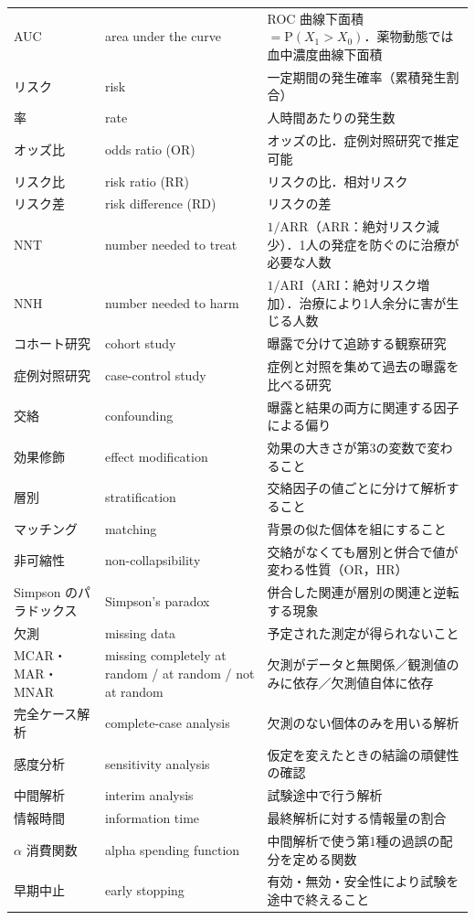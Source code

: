 \documentclass[a4paper,11pt,openany]{ltjsbook}
\newcommand{\Prob}{\mathrm{P}}
\begin{document}
\begin{center}
\begin{longtable}{@{}L{32mm}L{40mm}L{78mm}@{}}
AUC & area under the curve & ROC 曲線下面積 $=\Prob(X_1>X_0)$．薬物動態では血中濃度曲線下面積\\
リスク & risk & 一定期間の発生確率（累積発生割合）\\
率 & rate & 人時間あたりの発生数\\
オッズ比 & odds ratio (OR) & オッズの比．症例対照研究で推定可能\\
リスク比 & risk ratio (RR) & リスクの比．相対リスク\\
リスク差 & risk difference (RD) & リスクの差\\
NNT & number needed to treat & $1/\mathrm{ARR}$（ARR：絶対リスク減少）．1人の発症を防ぐのに治療が必要な人数\\
NNH & number needed to harm & $1/\mathrm{ARI}$（ARI：絶対リスク増加）．治療により1人余分に害が生じる人数\\
コホート研究 & cohort study & 曝露で分けて追跡する観察研究\\
症例対照研究 & case-control study & 症例と対照を集めて過去の曝露を比べる研究\\
交絡 & confounding & 曝露と結果の両方に関連する因子による偏り\\
効果修飾 & effect modification & 効果の大きさが第3の変数で変わること\\
層別 & stratification & 交絡因子の値ごとに分けて解析すること\\
マッチング & matching & 背景の似た個体を組にすること\\
非可縮性 & non-collapsibility & 交絡がなくても層別と併合で値が変わる性質（OR，HR）\\
Simpson のパラドックス & Simpson's paradox & 併合した関連が層別の関連と逆転する現象\\
欠測 & missing data & 予定された測定が得られないこと\\
MCAR・MAR・MNAR & missing completely at random / at random / not at random & 欠測がデータと無関係／観測値のみに依存／欠測値自体に依存\\
完全ケース解析 & complete-case analysis & 欠測のない個体のみを用いる解析\\
感度分析 & sensitivity analysis & 仮定を変えたときの結論の頑健性の確認\\
中間解析 & interim analysis & 試験途中で行う解析\\
情報時間 & information time & 最終解析に対する情報量の割合\\
$\alpha$ 消費関数 & alpha spending function & 中間解析で使う第1種の過誤の配分を定める関数\\
早期中止 & early stopping & 有効・無効・安全性により試験を途中で終えること\\

\end{longtable}
\end{center}
\end{document}
